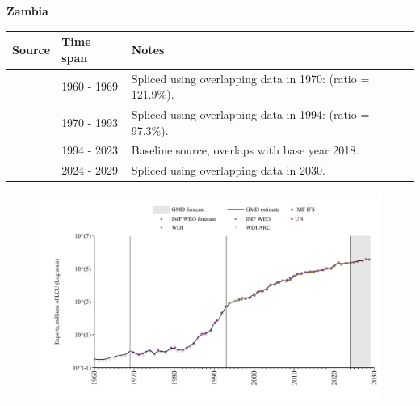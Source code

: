 \documentclass[12pt,a4paper,landscape]{article}
\begin{document}
\begin{adjustbox}{max totalsize={\paperwidth}{\paperheight},center}
\begin{minipage}[t][\textheight][t]{\textwidth}
\vspace*{0.5cm}
{}
\begin{center}
{\Large\bfseries Zambia}
\end{center}
\vspace{0.5cm}
\begin{table}[H]
\centering
\small
\begin{tabular}{|l|l|l|}
\hline
\textbf{Source} & \textbf{Time span} & \textbf{Notes} \\
\hline
\rowcolor{white}\cite{WDI_ARC}& 1960 - 1969 &Spliced using overlapping data in 1970: (ratio = 121.9\%).\\
\rowcolor{lightgray}\cite{UN}& 1970 - 1993 &Spliced using overlapping data in 1994: (ratio = 97.3\%).\\
\rowcolor{white}\cite{WDI}& 1994 - 2023 &Baseline source, overlaps with base year 2018.\\
\rowcolor{lightgray}\cite{IMF_WEO_forecast}& 2024 - 2029 &Spliced using overlapping data in 2030.\\
\hline
\end{tabular}
\end{table}
\begin{figure}[H]
\centering
\includegraphics[width=\textwidth,height=0.6\textheight,keepaspectratio]{graphs/ZMB_exports.pdf}
\end{figure}
\end{minipage}
\end{adjustbox}
\end{document}
